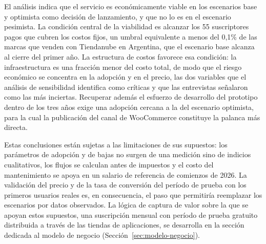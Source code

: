 El análisis indica que el servicio es económicamente viable en los escenarios base y optimista como decisión de lanzamiento, y que no lo es en el escenario pesimista. La condición central de la viabilidad es alcanzar los 55 suscriptores pagos que cubren los costos fijos, un umbral equivalente a menos del 0,1\% de las marcas que venden con Tiendanube en Argentina, que el escenario base alcanza al cierre del primer año. La estructura de costos favorece esa condición: la infraestructura es una fracción menor del costo total, de modo que el riesgo económico se concentra en la adopción y en el precio, las dos variables que el análisis de sensibilidad identifica como críticas y que las entrevistas señalaron como las más inciertas. Recuperar además el esfuerzo de desarrollo del prototipo dentro de los tres años exige una adopción cercana a la del escenario optimista, para la cual la publicación del canal de WooCommerce constituye la palanca más directa.

Estas conclusiones están sujetas a las limitaciones de sus supuestos: los parámetros de adopción y de bajas no surgen de una medición sino de indicios cualitativos, los flujos se calculan antes de impuestos y el costo del mantenimiento se apoya en un salario de referencia de comienzos de 2026. La validación del precio y de la tasa de conversión del período de prueba con los primeros usuarios reales es, en consecuencia, el paso que permitiría reemplazar los escenarios por datos observados. La lógica de captura de valor sobre la que se apoyan estos supuestos, una suscripción mensual con período de prueba gratuito distribuida a través de las tiendas de aplicaciones, se desarrolla en la sección dedicada al modelo de negocio (Sección~\ref{sec:modelo-negocio}).
